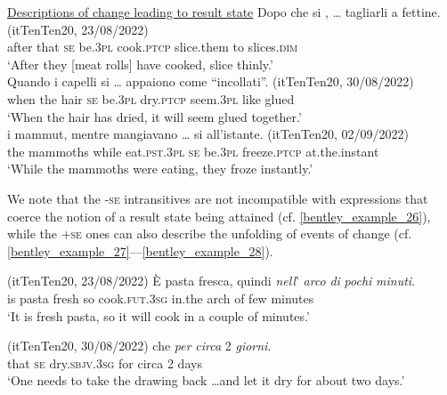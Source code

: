 \documentclass[output=paper,colorlinks,citecolor=brown
]{langscibook}
\begin{document}
\ea \label{bentley_example_25}
    \underline{Descriptions of change leading to result state} 
    \ea  \label{bentley_example_25a}
    \gll Dopo che	si 		 		,  {\ldots}  tagliarli			a fettine. {(itTenTen20, 23/08/2022)} \\
   				after		that	\textsc{se}		be.3\textsc{pl}	cook.\textsc{ptcp}	{} slice.them	to	slices.\textsc{dim} {} \\
    \glt ‘After they [meat rolls] have cooked, slice thinly.’ \\
    \ex \label{bentley_example_25b}
    \gll Quando		i		capelli	si		 		  {\ldots}  appaiono		come “incollati”. {(itTenTen20, 30/08/2022)}\\
    when			the	hair			\textsc{se}		be.3\textsc{pl}	dry.\textsc{ptcp}	{}					seem.3\textsc{pl}		like			glued	{} \\
    \glt 					‘When the hair has dried, it will seem glued together.’ \\
    \ex \label{bentley_example_25c}
    \gll  {\ldots}  i			mammut,		mentre		mangiavano  {\ldots}  si 		 		 		all’istante. {(itTenTen20, 02/09/2022)} \\
    {} 									the	mammoths	while			eat.\textsc{pst}.3\textsc{pl}			{}			\textsc{se}		be.3\textsc{pl}	freeze.\textsc{ptcp}	 at.the.instant	{} \\
    \glt 									‘While the mammoths	 were eating, they froze instantly.’ \\
    \z
\z

We note that the -\textsc{se} intransitives are not incompatible with expressions that coerce the notion of a result state being attained (cf. \ref{bentley_example_26}), while the +\textsc{se} ones can also describe the unfolding of events of change (cf. \ref{bentley_example_27}—\ref{bentley_example_28}).

\hspace*{\fill}(itTenTen20, 23/08/2022)\quad
\ea \label{bentley_example_26}
    \gll È	pasta	fresca,	quindi  					\textit{nell}’			\textit{arco}		\textit{di}	 	\textit{pochi} \textit{minuti}. \\
    		is	pasta	fresh		so					cook.\textsc{fut}.3\textsc{sg}	in.the		arch		of		few		minutes \\
    \glt ‘It is fresh pasta, so it will cook in a couple of minutes.’
\z

\hspace*{\fill}(itTenTen20, 30/08/2022)\quad
\ea \label{bentley_example_27}
      che									\textit{per}		\textit{circa}	2	\textit{giorni}. \\
    	{} 		that	\textsc{se}		dry.\textsc{sbjv}.3\textsc{sg}		for		circa	2	days \\
    \glt	‘One needs to take the drawing back \ldots  and let it dry for about two days.’
\z
\end{document}
